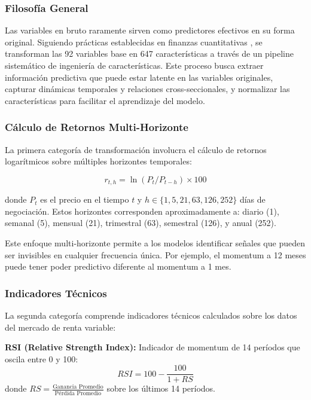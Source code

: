 \documentclass[11pt,a4paper]{article}
\begin{document}
\subsubsection{Filosofía General}

Las variables en bruto raramente sirven como predictores efectivos en su forma original. Siguiendo prácticas establecidas en finanzas cuantitativas \citep{gu2020}, se transforman las 92 variables base en 647 características a través de un pipeline sistemático de ingeniería de características. Este proceso busca extraer información predictiva que puede estar latente en las variables originales, capturar dinámicas temporales y relaciones cross-seccionales, y normalizar las características para facilitar el aprendizaje del modelo.

\subsubsection{Cálculo de Retornos Multi-Horizonte}

La primera categoría de transformación involucra el cálculo de retornos logarítmicos sobre múltiples horizontes temporales:

\begin{equation}
r_{t,h} = \ln(P_t / P_{t-h}) \times 100
\end{equation}

donde $P_t$ es el precio en el tiempo $t$ y $h \in \{1, 5, 21, 63, 126, 252\}$ días de negociación. Estos horizontes corresponden aproximadamente a: diario (1), semanal (5), mensual (21), trimestral (63), semestral (126), y anual (252).

Este enfoque multi-horizonte permite a los modelos identificar señales que pueden ser invisibles en cualquier frecuencia única. Por ejemplo, el momentum a 12 meses puede tener poder predictivo diferente al momentum a 1 mes.

\subsubsection{Indicadores Técnicos}

La segunda categoría comprende indicadores técnicos calculados sobre los datos del mercado de renta variable:

\textbf{RSI (Relative Strength Index):} Indicador de momentum de 14 períodos que oscila entre 0 y 100:
\begin{equation}
RSI = 100 - \frac{100}{1 + RS}
\end{equation}
donde $RS = \frac{\text{Ganancia Promedio}}{\text{Pérdida Promedio}}$ sobre los últimos 14 períodos.
\end{document}
